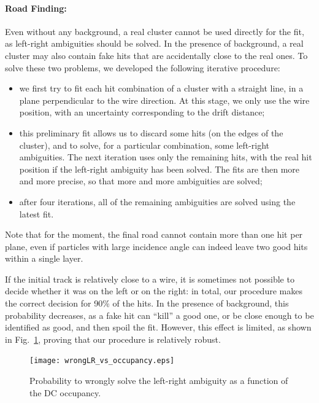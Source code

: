 \paragraph{Road Finding:}

Even without any background, a real cluster cannot be used directly for the fit, as 
left-right ambiguities should be solved.  In the presence of background, a real 
cluster may also contain fake hits that are accidentally close to the real ones.  To 
solve these two problems, we developed the following iterative procedure:

\begin{itemize}
\item we first try to fit each hit combination of a cluster with a straight line, in 
a plane perpendicular to the wire direction.  At this stage, we only use the wire 
position, with an uncertainty corresponding to the drift distance;
\item this preliminary fit allows us to discard some hits (on the edges of the 
cluster), and to solve, for a particular combination, some left-right ambiguities. 
The next iteration uses only the remaining hits, with the real hit position if the
left-right ambiguity has been solved.  The fits are then more and more precise, so 
that more and more ambiguities are solved;
\item after four iterations, all of the remaining ambiguities are solved using the 
latest fit.
\end{itemize}

Note that for the moment, the final road cannot contain more than one hit per plane, 
even if particles with large incidence angle can indeed leave two good hits within 
a single layer.

If the initial track is relatively close to a wire, it is sometimes not possible to 
decide whether it was on the left or on the right: in total, our procedure makes 
the correct decision for 90\% of the hits.  In the presence of background, this 
probability decreases, as a fake hit can ``kill'' a good one, or be close enough to 
be identified as good, and then spoil the fit.  However, this effect is limited, as 
shown in Fig.~\ref{sec_forward:pic_roadsincluster}, proving that our procedure is 
relatively robust.

\begin{figure}[ht!]
\centering
\texttt{[image: wrongLR\_vs\_occupancy.eps]}
\caption{\small{Probability to wrongly solve the left-right ambiguity as a function 
of the DC occupancy.}}
\label{sec_forward:pic_roadsincluster}
\end{figure}

